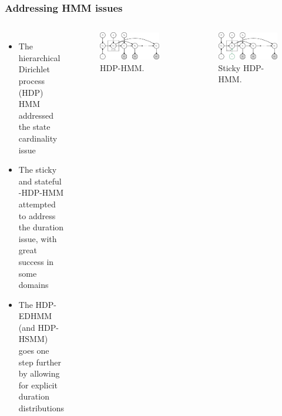 \documentclass[aspectratio=169]{beamer}
\begin{document}
    \begin{frame}
        \frametitle{Addressing HMM issues}

        \begin{columns}[c] 


            \begin{itemize}
                \item The hierarchical Dirichlet process (HDP) HMM addressed the state cardinality issue
                \item The sticky and stateful -HDP-HMM attempted to address the duration issue, with great success in some domains
                \item The HDP-EDHMM (and HDP-HSMM) goes one step further by allowing for explicit duration distributions
            \end{itemize}


            \begin{figure}
                \includegraphics[width=1.0\linewidth]{hdphmm.eps}
                \caption{HDP-HMM.}
            \end{figure}
            \vspace{-1cm}
            \begin{figure}
                \includegraphics[width=1.0\linewidth]{sticky-hdphmm.eps}
                \caption{Sticky HDP-HMM.}
            \end{figure}

        \end{columns}

    \end{frame}
\end{document}

